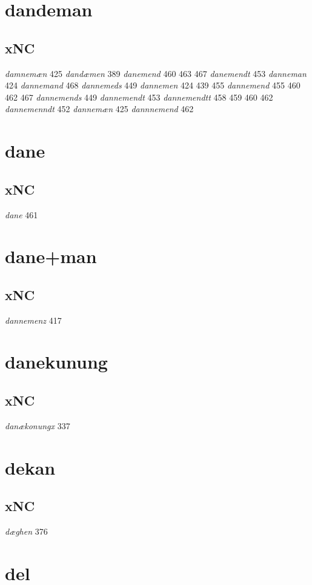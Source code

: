 \documentclass[a4paper,twocolumn]{article}
\begin{document}
\section{dandeman}
\label{sec:orgba2d0f6}
\subsection{xNC}
\label{sec:orgd43474d}
\emph{damnemæn} 425 \emph{dandæmen} 389 \emph{danemend} 460 463 467 \emph{danemendt} 453 \emph{danneman} 424 \emph{dannemand} 468 \emph{dannemeds} 449 \emph{dannemen} 424 439 455 \emph{dannemend} 455 460 462 467 \emph{dannemends} 449 \emph{dannemendt} 453 \emph{dannemendtt} 458 459 460 462 \emph{dannemenndt} 452 \emph{dannemæn} 425 \emph{dannnemend} 462 
\section{dane}
\label{sec:orgef2ae74}
\subsection{xNC}
\label{sec:orgb62ad5d}
\emph{dane} 461 
\section{dane+man}
\label{sec:org1d77ffe}
\subsection{xNC}
\label{sec:orgadcaaa8}
\emph{dannemenz} 417 
\section{danekunung}
\label{sec:orgcf5091c}
\subsection{xNC}
\label{sec:org9e3d993}
\emph{danækonungx} 337 
\section{dekan}
\label{sec:org1a51148}
\subsection{xNC}
\label{sec:orgd2a5ae1}
\emph{dæghen} 376 
\section{del}
\label{sec:org016512f}
\end{document}
